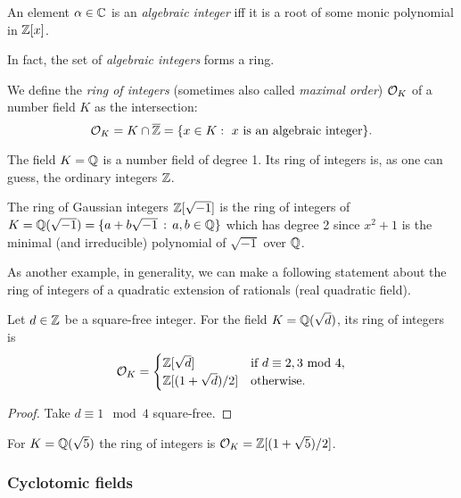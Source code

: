 \begin{definition}
    An element $\alpha \in \mathbb{C}$ is an \textit{algebraic integer} iff it is a root of some monic polynomial in $\mathbb{Z}[x]$.
\end{definition}
In fact, the set of \textit{algebraic integers} forms a ring.

\begin{definition}
We define the \textit{ring of integers} (sometimes also called \textit{maximal order}) $\mathcal{O}_K$ of a number field $K$ as the intersection:
$$
  \mathcal{O}_K = K \cap \overline{\mathbb{Z}} = \{x \in K : \text{ $x$ is an algebraic integer}\}.
$$
\end{definition}

\begin{example}
    The field $K = \mathbb{Q}$ is a number field of degree 1. Its ring of integers is, as one can guess, the ordinary integers $\mathbb{Z}$.
\end{example}

\begin{example}
    The ring of Gaussian integers $\mathbb{Z}[\sqrt{-1}]$ is the ring of integers of $K = \mathbb{Q}(\sqrt{-1}) = \{a + b\sqrt{-1}\, :\, a,b\in \mathbb{Q}\}$ which has degree 2 since $x^2+1$ is the minimal (and irreducible) polynomial of $\sqrt{-1}$ over $\mathbb{Q}$.
\end{example}

As another example, in generality, we can make a following statement about the ring of integers of a quadratic extension of rationals (real quadratic field).
\begin{lemma}
     Let $d \in \mathbb{Z}$ be a square-free integer. For the field $K = \mathbb{Q}(\sqrt{d})$, its ring of integers is 
     \[ \mathcal{O}_K = 
	 \begin{cases} 
	     \mathbb{Z}[\sqrt{d}] & \text{if $d \equiv 2, 3 \text{ mod } 4$}, \\
	     \mathbb{Z}[(1 + \sqrt{d})/2] & \text{otherwise}.
     	 \end{cases}
     \]
\end{lemma}

\begin{proof}
	Take $d \equiv 1 \mod 4$ square-free.
\end{proof}

\begin{example}
	For $K = \mathbb{Q}(\sqrt{5})$ the ring of integers is $\mathcal{O}_K = \mathbb{Z}[(1 + \sqrt{5})/2]$. 
\end{example}

\subsubsection*{Cyclotomic fields}

